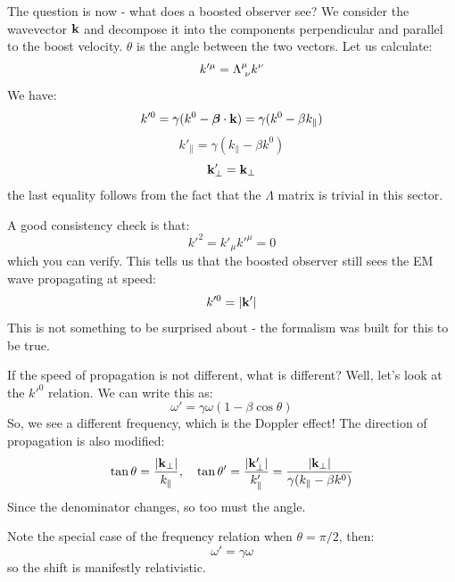 The question is now - what does a boosted observer see? We consider the wavevector $\mathbf{k}$ and decompose it into the components perpendicular and parallel to the boost velocity. $\theta$ is the angle between the two vectors. Let us calculate:
\begin{equation}
    k'^\mu = \Lambda^{\mu}_{\sp\nu}k^\nu
\end{equation}
We have:
\begin{equation}
    k'^0 = \gamma(k^0 - \mbox{\boldmath$ \beta $}\cdot\mathbf{k}) = \gamma(k^0 - \beta k_\parallel)
\end{equation}
\begin{equation}
    k'_\parallel = \gamma(k_\parallel - \beta k^0)
\end{equation}
\begin{equation}
    \mathbf{k}'_\perp = \mathbf{k}_\perp
\end{equation}
the last equality follows from the fact that the $\Lambda$ matrix is trivial in this sector.

A good consistency check is that:
\begin{equation}
    k'^2 = k'_\mu k'^\mu = 0
\end{equation}
which you can verify. This tells us that the boosted observer still sees the EM wave propagating at speed:
\begin{equation}
    k'^0 = \lvert \mathbf{k}' \rvert
\end{equation}
This is not something to be surprised about - the formalism was built for this to be true.

If the speed of propagation is not different, what is different? Well, let's look at the $k'^0$ relation. We can write this as:
\begin{equation}
    \omega' = \gamma\omega(1 - \beta\cos\theta)
\end{equation}
So, we see a different frequency, which is the Doppler effect! The direction of propagation is also modified:
\begin{equation}
    \tan\theta = \frac{\lvert \mathbf{k}_\perp \rvert}{k_\parallel}, \quad \tan\theta' = \frac{\lvert \mathbf{k}'_\perp \rvert}{k'_\parallel} =  \frac{\lvert \mathbf{k}_\perp \rvert}{\gamma(k_\parallel - \beta k^0)}
\end{equation}
Since the denominator changes, so too must the angle.

Note the special case of the frequency relation when $\theta = \pi/2$, then:
\begin{equation}
    \omega' = \gamma\omega
\end{equation}
so the shift is manifestly relativistic.

